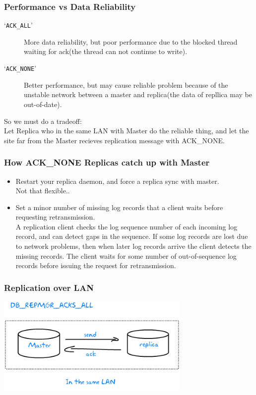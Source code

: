 \documentclass{beamer}
\newcommand{\command}[1]{`\texttt{#1}'}
\begin{document}
\begin{frame}
\frametitle{Performance vs Data Reliability}
\begin{description}
\item[\command{ACK\_ALL}]
More data reliability, but poor performance due to the blocked thread waiting for ack(the thread can not continue to write).
\item[\command{ACK\_NONE}]
Better performance, but may cause reliable problem because of the unstable network between a master and replica(the data of repllica may be out-of-date).  
\end{description}
So we must do a tradeoff:\\
Let Replica who in the same LAN with Master do the reliable thing, 
and let the site far from the Master recieves replication message with ACK\_NONE. 
\end{frame}

\begin{frame}
\frametitle{How ACK\_NONE Replicas catch up with Master}
\begin{itemize}
\item Restart your replica daemon, and force a replica sync with master.\\
Not that flexible..
\item Set a minor number of missing log records that a client waits before requesting retransmission.\\
A replication client checks the log sequence number of each incoming log record, and can detect gaps in the sequence. If some log records are lost due to network problems, then when later log records arrive the client detects the missing records. The client waits for some number of out-of-sequence log records before issuing the request for retransmission. 
\end{itemize}
\end{frame}

\begin{frame}
\frametitle{Replication over LAN}
\begin{center}
\includegraphics[scale=1,width=0.70\textwidth]{rep_lan.png}
\end{center}
\end{frame}
\end{document}
